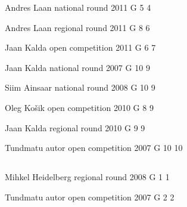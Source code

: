 \documentclass[11pt]{article}
\begin{document}
\ylDisplay{} %
{Andres Laan} %
{national round} %
{2011} %
{G 5} %
{4} %
{

\ifEngStatement
\fi
}

\ylDisplay{} %
{Andres Laan} %
{regional round} %
{2011} %
{G 8} %
{6} %
{

\ifEngStatement
\fi
}

\ylDisplay{} %
{Jaan Kalda} %
{open competition} %
{2011} %
{G 6} %
{7} %
{

\ifEngStatement
\fi
}

\ylDisplay{} %
{Jaan Kalda} %
{national round} %
{2007} %
{G 10} %
{9} %
{

\ifEngStatement
\fi
}

\ylDisplay{} %
{Siim Ainsaar} %
{national round} %
{2008} %
{G 10} %
{9} %
{

\ifEngStatement
\fi
}

\ylDisplay{} %
{Oleg Košik} %
{open competition} %
{2010} %
{G 8} %
{9} %
{

\ifEngStatement
\fi
}

\ylDisplay{} %
{Jaan Kalda} %
{regional round} %
{2010} %
{G 9} %
{9} %
{

\ifEngStatement
\fi
}

\ylDisplay{} %
{Tundmatu autor} %
{open competition} %
{2007} %
{G 10} %
{10} %
{

\ifEngStatement
\fi
}
\newpage\subsection{\protect{}}

\ylDisplay{} %
{Mihkel Heidelberg} %
{regional round} %
{2008} %
{G 1} %
{1} %
{

\ifEngStatement
\fi
}

\ylDisplay{} %
{Tundmatu autor} %
{open competition} %
{2007} %
{G 2} %
{2} %
{

\ifEngStatement
\fi
}
\end{document}

